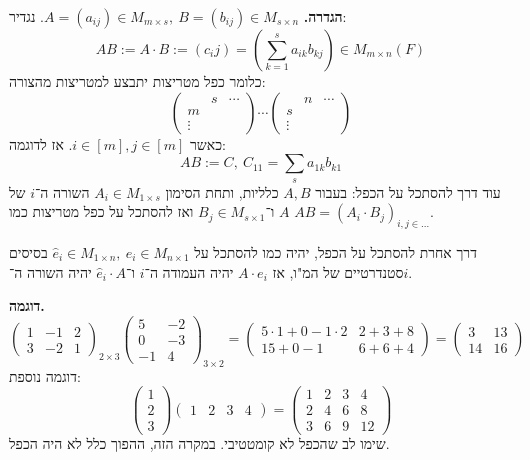 \documentclass[]{article}
\newcommand\cl [1]    {\left ( #1 \right )}
\newcommand\pms[1]    {\begin{pmatrix}
		#1
\end{pmatrix}}
\begin{document}
	\textbf{הגדרה. }$A = (a_{ij})\in M_{m \times s}, \ B = (b_{ij}) \in M_{s \times n}$. נגדיר: 
	\[ AB := A \cdot B := (c_ij) = \cl{\sum_{k = 1}^{s}a_{ik}b_{kj}} \in M_{m \times n}(F) \]
	כלומר כפל מטריצות יתבצע למטריצות מהצורה: 
	\[ \pms{\  & s & \cdots \\ m & & \\ \vdots & &} \cdots \pms{\  & n & \cdots \\ s & & \\ \vdots & &} \]
	כאשר $i \in [m], j \in [m]$. אז לדוגמה: 
	\[ AB := C, \ C_{11} = \sum_{s} {a_{1k}b_{k1}} \]
	עוד דרך להסתכל על הכפל: בעבור $A, B$ כלליות, ותחת הסימון $A_i \in M_{1 \times s}$ השורה ה־$i$ של $A$ ו־$B_j \in M_{s\times 1}$ ואז להסתכל על כפל מטריצות כמו $AB = (A_i \cdot B_j)_{i, j \in ...}$. 
	
	דרך אחרת להסתכל על הכפל, יהיה כמו להסתכל על $\hat e_i \in M_{1 \times n}, \ e_i \in M_{n \times 1}$ בסיסים סטנדרטיים של המ"ו, אז $A \cdot e_i$ יהיה העמודה ה־$i$ ו־$\hat e_i \cdot A$ יהיה השורה ה־$i$. 
	
	\textbf{דוגמה. }
	\[ \pms{1 & -1 & 2 \\ 3 & -2 & 1}_{2 \times 3} \pms{5 & -2 \\ 0 & -3 \\ -1 & 4}_{3 \times 2} = \pms{5 \cdot 1 + 0  -1 \cdot 2 & 2 + 3 + 8 \\ 15 + 0 - 1 & 6 + 6 + 4} = \pms{3 & 13 \\ 14 & 16} \]
	דוגמה נוספת: 
	\[ \pms{1 \\ 2 \\ 3}\pms{1 & 2 & 3 & 4} = \pms{1 & 2 & 3 & 4 \\ 2 & 4 & 6 & 8 \\ 3 & 6 & 9 & 12} \]
	שימו לב שהכפל לא קומטטיבי. במקרה הזה, ההפוך כלל לא היה הכפל. 
	
\end{document}
